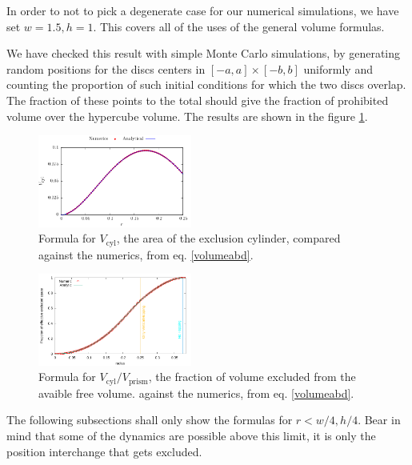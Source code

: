 \documentclass[superscriptaddress,pre,reprint,showpacs,onecolumn]{revtex4-1}
\begin{document}
In order to not to pick a degenerate case for our numerical simulations,
we have set $w=1.5, h=1$. This covers all of the uses of the general volume formulas.


We have checked this result with simple Monte Carlo simulations, 
by generating random positions for the discs centers in 
$[-a,a] \times [-b,b]$ uniformly and 
counting the proportion of such initial conditions for 
which the two discs overlap. The fraction of these points to the 
total should give the fraction of prohibited volume over the hypercube
volume. The results are shown in the figure \ref{VolMonteC}.

\begin{figure}[h]
\centering
\includegraphics[width=0.45\textwidth]{./FigurasPerfectas/VolCyl02.pdf}
\caption{Formula for $V_\text{cyl}$, the area of the exclusion cylinder, compared
  against the numerics, from eq. \ref{volumeabd}.
}%
\end{figure}

\begin{figure}[h]
\centering
\includegraphics[width=0.45\textwidth]{./FigurasPerfectas/VolumenExacto01.pdf}
\caption{Formula for $V_\text{cyl}/V_\text{prism}$, the fraction of volume excluded from
  the avaible free volume.
  against the numerics, from eq. \ref{volumeabd}.
}\label{VolMonteC}%
\end{figure}


The following subsections shall only show the formulas for $r<w/4, h/4$.
Bear in mind that some of the dynamics are possible above this limit,
it is only the position interchange that gets excluded. \\
\end{document}

